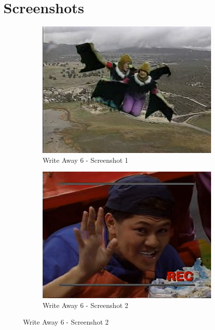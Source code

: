 \section{Screenshots}

\begin{figure}[H]
    \centering
    \begin{subfigure}{0.45\textwidth}
        \centering
        \includegraphics[width=\linewidth]{Games/WriteAway/Images/WriteAway6Screenshot1.jpg}
        \caption{Write Away 6 - Screenshot 1}
    \end{subfigure}
    \begin{subfigure}{0.45\textwidth}
        \centering
        \includegraphics[width=\linewidth]{Games/WriteAway/Images/WriteAway6Screenshot2.png}
        \caption{Write Away 6 - Screenshot 2}
    \end{subfigure}


\end{figure}
